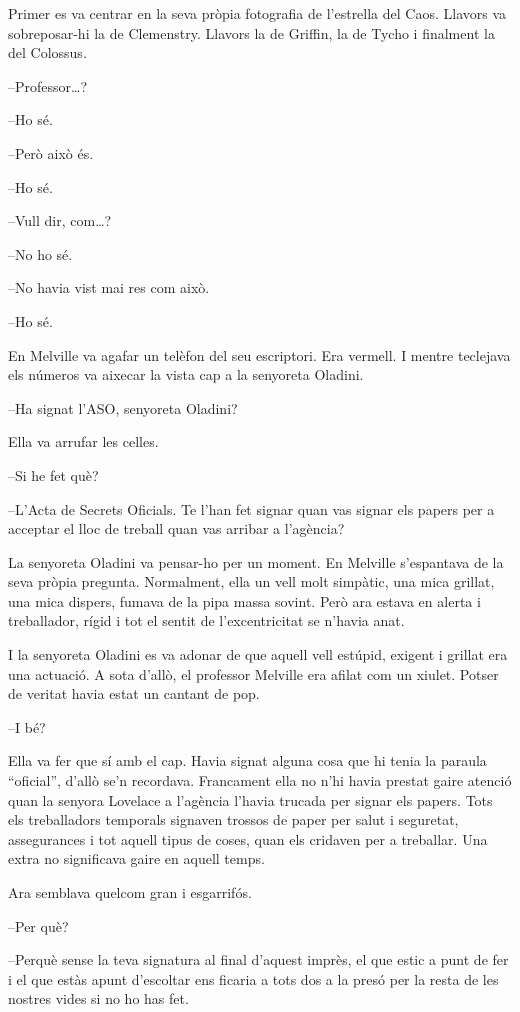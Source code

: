 Primer es va centrar en la seva pròpia fotografia de l'estrella del
Caos. Llavors va sobreposar-hi la de Clemenstry. Llavors la de Griffin,
la de Tycho i finalment la del Colossus.

--Professor\ldots{}?

--Ho sé.

--Però això és.

--Ho sé.

--Vull dir, com\ldots{}?

--No ho sé.

--No havia vist mai res com això.

--Ho sé.

En Melville va agafar un telèfon del seu escriptori. Era vermell. I
mentre teclejava els números va aixecar la vista cap a la senyoreta
Oladini.

--Ha signat l'ASO, senyoreta Oladini?

Ella va arrufar les celles.

--Si he fet què?

--L'Acta de Secrets Oficials. Te l'han fet signar quan vas signar els
papers per a acceptar el lloc de treball quan vas arribar a l'agència?

La senyoreta Oladini va pensar-ho per un moment. En Melville s'espantava
de la seva pròpia pregunta. Normalment, ella un vell molt simpàtic, una
mica grillat, una mica dispers, fumava de la pipa massa sovint. Però ara
estava en alerta i treballador, rígid i tot el sentit de l'excentricitat
se n'havia anat.

I la senyoreta Oladini es va adonar de que aquell vell estúpid, exigent
i grillat era una actuació. A sota d'allò, el professor Melville era
afilat com un xiulet. Potser de veritat havia estat un cantant de pop.

--I bé?

Ella va fer que sí amb el cap. Havia signat alguna cosa que hi tenia la
paraula ``oficial'', d'allò se'n recordava. Francament ella no n'hi
havia prestat gaire atenció quan la senyora Lovelace a l'agència l'havia
trucada per signar els papers. Tots els treballadors temporals signaven
trossos de paper per salut i seguretat, assegurances i tot aquell tipus
de coses, quan els cridaven per a treballar. Una extra no significava
gaire en aquell temps.

Ara semblava quelcom gran i esgarrifós.

--Per què?

--Perquè sense la teva signatura al final d'aquest imprès, el que estic
a punt de fer i el que estàs apunt d'escoltar ens ficaria a tots dos a
la presó per la resta de les nostres vides si no ho has fet.

